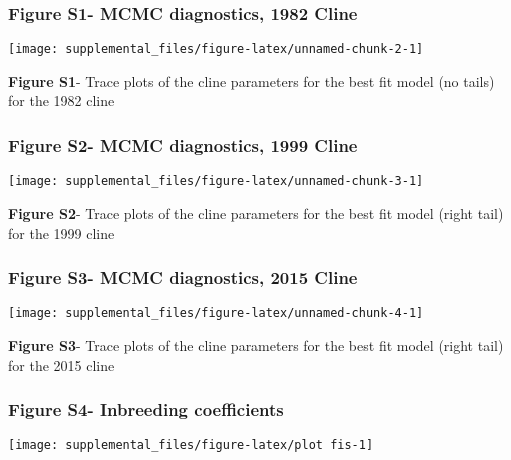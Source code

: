 \documentclass[]{article}
\begin{document}
\pagebreak

\subsubsection{Figure S1- MCMC diagnostics, 1982
Cline}\label{figure-s1--mcmc-diagnostics-1982-cline}

\begin{center}\texttt{[image: supplemental\_files/figure-latex/unnamed-chunk-2-1]} \end{center}

\textbf{Figure S1}- Trace plots of the cline parameters for the best fit
model (no tails) for the 1982 cline

\pagebreak

\subsubsection{Figure S2- MCMC diagnostics, 1999
Cline}\label{figure-s2--mcmc-diagnostics-1999-cline}

\begin{center}\texttt{[image: supplemental\_files/figure-latex/unnamed-chunk-3-1]} \end{center}

\textbf{Figure S2}- Trace plots of the cline parameters for the best fit
model (right tail) for the 1999 cline

\pagebreak 

\subsubsection{Figure S3- MCMC diagnostics, 2015
Cline}\label{figure-s3--mcmc-diagnostics-2015-cline}

\begin{center}\texttt{[image: supplemental\_files/figure-latex/unnamed-chunk-4-1]} \end{center}

\textbf{Figure S3}- Trace plots of the cline parameters for the best fit
model (right tail) for the 2015 cline

\pagebreak

\subsubsection{Figure S4- Inbreeding
coefficients}\label{figure-s4--inbreeding-coefficients}

\begin{center}\texttt{[image: supplemental\_files/figure-latex/plot fis-1]} \end{center}
\end{document}
